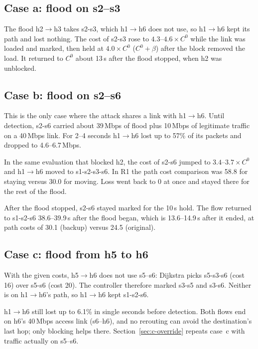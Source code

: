 \documentclass[11pt,a4paper]{article}
\newcommand{\ra}{\ensuremath{\rightarrow}}
\begin{document}
\subsection{Case a: flood on s2--s3}

The flood h2\ra h3 takes s2-s3, which h1\ra h6 does not use, so h1\ra h6 kept its path and lost nothing. The cost
of s2-s3 rose to $4.3$--$4.6\times C^0$ while the link was loaded and marked, then held at $4.0\times C^0$
($C^0+\beta$) after the block removed the load. It returned to $C^0$ about 13\,s after the flood stopped, when h2
was unblocked.

\subsection{Case b: flood on s2--s6}

This is the only case where the attack shares a link with h1\ra h6. Until detection, s2-s6 carried about
39\,Mbps of flood plus 10\,Mbps of legitimate traffic on a 40\,Mbps link. For 2--4 seconds h1\ra h6 lost up to
57\% of its packets and dropped to 4.6--6.7\,Mbps.

In the same evaluation that blocked h2, the cost of s2-s6 jumped to $3.4$--$3.7\times C^0$ and h1\ra h6 moved to
s1-s2-s3-s6. In R1 the path cost comparison was 58.8 for staying versus 30.0 for moving. Loss went back to 0 at
once and stayed there for the rest of the flood.

After the flood stopped, s2-s6 stayed marked for the 10\,s hold. The flow returned to s1-s2-s6 38.6--39.9\,s
after the flood began, which is 13.6--14.9\,s after it ended, at path costs of 30.1 (backup) versus 24.5
(original).

\subsection{Case c: flood from h5 to h6}

With the given costs, h5\ra h6 does not use s5--s6: Dijkstra picks s5-s3-s6 (cost 16) over s5-s6 (cost 20). The
controller therefore marked s3-s5 and s3-s6. Neither is on h1\ra h6's path, so h1\ra h6 kept s1-s2-s6.

h1\ra h6 still lost up to 6.1\% in single seconds before detection. Both flows end on h6's 40\,Mbps access link
(s6--h6), and no rerouting can avoid the destination's last hop; only blocking helps there.
Section~\ref{sec:c-override} repeats case~c with traffic actually on s5--s6.

\end{document}
